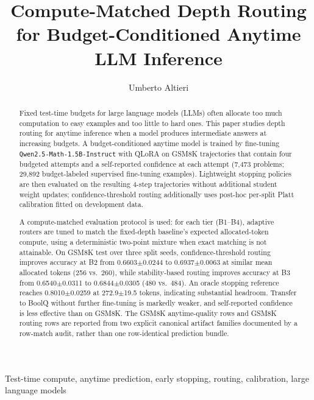 \documentclass[conference]{IEEEtran}
\title{Compute-Matched Depth Routing for Budget-Conditioned Anytime LLM Inference}
\author{Umberto Altieri}
\begin{document}
\maketitle

\begin{abstract}
Fixed test-time budgets for large language models (LLMs) often allocate too much computation to easy examples and too little to hard ones. This paper studies depth routing for anytime inference when a model produces intermediate answers at increasing budgets. A budget-conditioned anytime model is trained by fine-tuning \texttt{Qwen2.5-Math-1.5B-Instruct} with QLoRA on GSM8K trajectories that contain four budgeted attempts and a self-reported confidence at each attempt (7,473 problems; 29,892 budget-labeled supervised fine-tuning examples). Lightweight stopping policies are then evaluated on the resulting 4-step trajectories without additional student weight updates; confidence-threshold routing additionally uses post-hoc per-split Platt calibration fitted on development data.

A compute-matched evaluation protocol is used: for each tier (B1--B4), adaptive routers are tuned to match the fixed-depth baseline's expected allocated-token compute, using a deterministic two-point mixture when exact matching is not attainable. On GSM8K test over three split seeds, confidence-threshold routing improves accuracy at B2 from 0.6603$\pm$0.0244 to 0.6937$\pm$0.0063 at similar mean allocated tokens (256 vs.\ 260), while stability-based routing improves accuracy at B3 from 0.6540$\pm$0.0311 to 0.6844$\pm$0.0305 (480 vs.\ 484). An oracle stopping reference reaches 0.8010$\pm$0.0259 at 272.9$\pm$19.5 tokens, indicating substantial headroom. Transfer to BoolQ without further fine-tuning is markedly weaker, and self-reported confidence is less effective than on GSM8K. The GSM8K anytime-quality rows and GSM8K routing rows are reported from two explicit canonical artifact families documented by a row-match audit, rather than one row-identical prediction bundle.
\end{abstract}

\begin{IEEEkeywords}
Test-time compute, anytime prediction, early stopping, routing, calibration, large language models
\end{IEEEkeywords}

\end{document}
